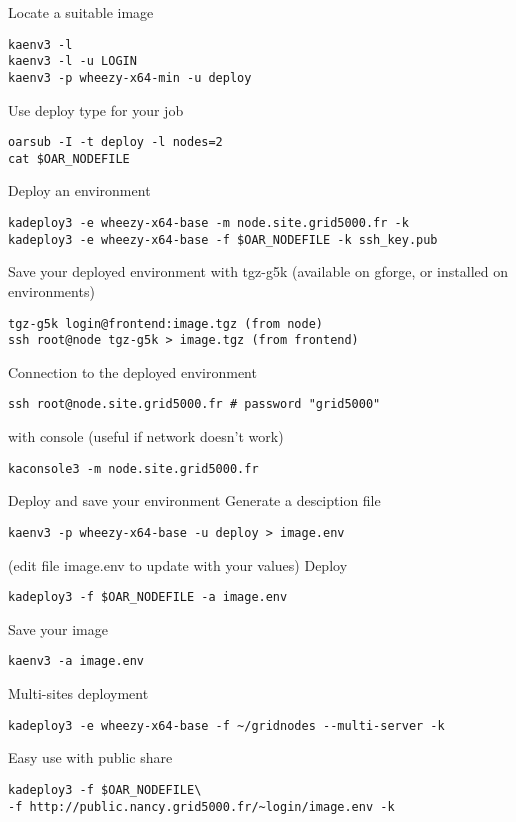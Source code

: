 Locate a suitable image
\begin{lstlisting}
kaenv3 -l
kaenv3 -l -u LOGIN
kaenv3 -p wheezy-x64-min -u deploy
\end{lstlisting}

Use deploy type for your job
\begin{lstlisting}
oarsub -I -t deploy -l nodes=2
cat $OAR_NODEFILE
\end{lstlisting}

Deploy an environment
\begin{lstlisting}
kadeploy3 -e wheezy-x64-base -m node.site.grid5000.fr -k
kadeploy3 -e wheezy-x64-base -f $OAR_NODEFILE -k ssh_key.pub
\end{lstlisting}

Save your deployed environment with tgz-g5k
(available on gforge, or installed on environments)
\begin{lstlisting}
tgz-g5k login@frontend:image.tgz (from node)
ssh root@node tgz-g5k > image.tgz (from frontend)
\end{lstlisting}

Connection to the deployed environment
\begin{lstlisting}
ssh root@node.site.grid5000.fr # password "grid5000"
\end{lstlisting}
with console (useful if network doesn't work)
\begin{lstlisting}
kaconsole3 -m node.site.grid5000.fr
\end{lstlisting}

Deploy and save your environment
Generate a desciption file
\begin{lstlisting}
kaenv3 -p wheezy-x64-base -u deploy > image.env
\end{lstlisting}
(edit file image.env to update with your values)
Deploy
\begin{lstlisting}
kadeploy3 -f $OAR_NODEFILE -a image.env
\end{lstlisting}
Save your image
\begin{lstlisting}
kaenv3 -a image.env
\end{lstlisting}

Multi-sites deployment
\begin{lstlisting}
kadeploy3 -e wheezy-x64-base -f ~/gridnodes --multi-server -k
\end{lstlisting}
Easy use with public share
\begin{lstlisting}
kadeploy3 -f $OAR_NODEFILE\
-f http://public.nancy.grid5000.fr/~login/image.env -k
\end{lstlisting}